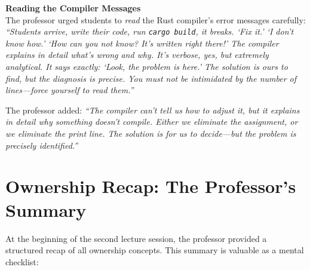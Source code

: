 \begin{insightbox}
\textbf{Reading the Compiler Messages} \\
The professor urged students to \emph{read} the Rust compiler's error messages carefully: \emph{``Students arrive, write their code, run \texttt{cargo build}, it breaks. `Fix it.' `I don't know how.' `How can you not know? It's written right there!' The compiler explains in detail what's wrong and why. It's verbose, yes, but extremely analytical. It says exactly: `Look, the problem is here.' The solution is ours to find, but the diagnosis is precise. You must not be intimidated by the number of lines---force yourself to read them.''}

The professor added: \emph{``The compiler can't tell us how to adjust it, but it explains in detail why something doesn't compile. Either we eliminate the assignment, or we eliminate the print line. The solution is for us to decide---but the problem is precisely identified.''}
\end{insightbox}

\section{Ownership Recap: The Professor's Summary}

At the beginning of the second lecture session, the professor provided a structured recap of all ownership concepts. This summary is valuable as a mental checklist:

